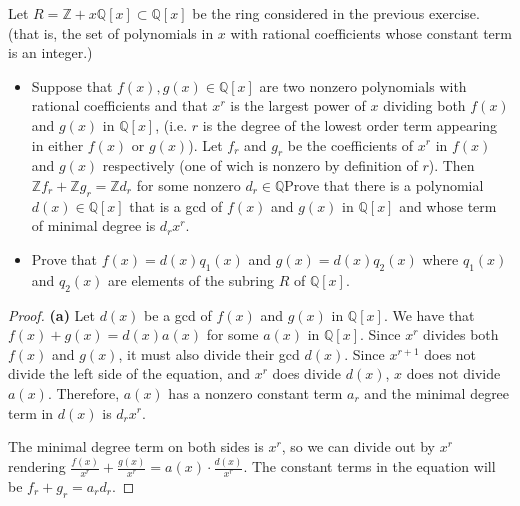 \documentclass[10pt]{article}
\newenvironment{problem}[2][Problem]{\begin{trivlist}
		\item[\hskip \labelsep {\bfseries #1}\hskip \labelsep {\bfseries #2.}]}{\end{trivlist}}
\begin{document}
	\begin{problem}{3.5}
		Let $R=\mathbb{Z} + x\mathbb{Q}[x] \subset \mathbb{Q}[x]$ be the ring considered in the previous exercise. (that is, the set of polynomials in $x$ with rational coefficients whose constant term is an integer.)
		\begin{itemize}
			\item[\textbf{(a)}] 
				Suppose that $f(x),g(x) \in \mathbb{Q}[x]$ are two nonzero polynomials with rational coefficients and that $x^r$ is the largest power of $x$ dividing both $f(x)$ and $g(x)$ in $\mathbb{Q}[x]$, (i.e. $r$ is the degree of the lowest order term appearing in either $f(x)$ or $g(x)$). Let $f_r$ and $g_r$ be the coefficients of $x^r$ in $f(x)$ and $g(x)$ respectively (one of wich is nonzero by definition of $r$). Then $\mathbb{Z}f_r + \mathbb{Z}g_r = \mathbb{Z}d_r$ for some nonzero $d_r \in \mathbb{Q}$Prove that there is a polynomial $d(x) \in \mathbb{Q}[x]$ that is a gcd of $f(x)$ and $g(x)$ in $\mathbb{Q}[x]$ and whose term of minimal degree is $d_r x^r$.
			\item[\textbf{(b)}]
				Prove that $f(x)=d(x)q_1(x)$ and $g(x) = d(x)q_2(x)$ where $q_1(x)$ and $q_2(x)$ are elements of the subring $R$ of $\mathbb{Q}[x]$.
		\end{itemize}
		\begin{proof}{\textbf{(a)}}
			Let $d(x)$ be a gcd of $f(x)$ and $g(x)$ in $\mathbb{Q}[x]$. We have that $f(x) + g(x) = d(x)a(x)$ for some $a(x)$ in $\mathbb{Q}[x]$. Since $x^r$ divides both $f(x)$ and $g(x)$, it must also divide their gcd $d(x)$. Since $x^{r+1}$ does not divide the left side of the equation, and $x^r$ does divide $d(x)$, $x$ does not divide $a(x)$. Therefore, $a(x)$ has a nonzero constant term $a_r$ and the minimal degree term in $d(x)$ is $d_rx^r$.
			
			The minimal degree term on both sides is $x^r$, so we can divide out by $x^r$ rendering $\frac{f(x)}{x^r} + \frac{g(x)}{x^r} = a(x) \cdot \frac{d(x)}{x^r}$. The constant terms in the equation will be $f_r + g_r = a_rd_r$.
		\end{proof}
	\end{problem}
	
\end{document}
